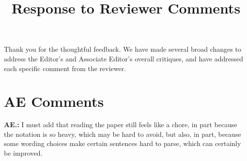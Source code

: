 \documentclass[letterpaper, parskip]{scrartcl}
\newcommand{\pointRaised}[2]{%
	\textbf{#1.\theresponsectr:} #2
}
\newcounter{responsectr}[section]     %
\begin{document}

	\title{Response to Reviewer Comments}
	\maketitle
	

	
Thank you for the thoughtful feedback. We have made several broad changes to address the Editor's and Associate Editor's overall critiques, and have addressed each specific comment from the reviewer.

\section{AE Comments}

\pointRaised{AE}{I must add that reading the paper still feels like a chore, in part because the notation is so heavy, which may be hard to avoid, but also, in part, because some wording choices make certain sentences hard to parse, which can certainly be improved.}


\end{document}
